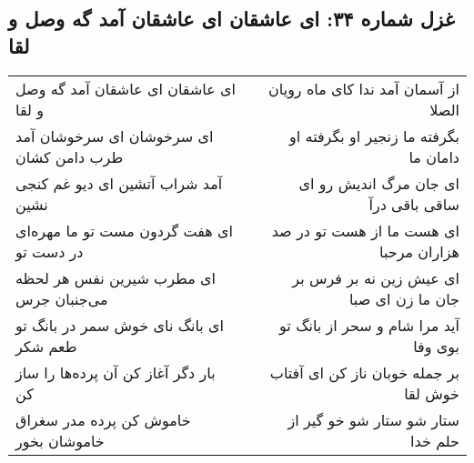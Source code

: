 \begin{center}
\section*{غزل شماره ۳۴: ای عاشقان ای عاشقان آمد گه وصل و لقا}
\label{sec:0034}
\begin{longtable}{l p{0.5cm} r}
ای عاشقان ای عاشقان آمد گه وصل و لقا
&&
از آسمان آمد ندا کای ماه رویان الصلا
\\
ای سرخوشان ای سرخوشان آمد طرب دامن کشان
&&
بگرفته ما زنجیر او بگرفته او دامان ما
\\
آمد شراب آتشین ای دیو غم کنجی نشین
&&
ای جان مرگ اندیش رو ای ساقی باقی درآ
\\
ای هفت گردون مست تو ما مهره‌ای در دست تو
&&
ای هست ما از هست تو در صد هزاران مرحبا
\\
ای مطرب شیرین نفس هر لحظه می‌جنبان جرس
&&
ای عیش زین نه بر فرس بر جان ما زن ای صبا
\\
ای بانگ نای خوش سمر در بانگ تو طعم شکر
&&
آید مرا شام و سحر از بانگ تو بوی وفا
\\
بار دگر آغاز کن آن پرده‌ها را ساز کن
&&
بر جمله خوبان ناز کن ای آفتاب خوش لقا
\\
خاموش کن پرده مدر سغراق خاموشان بخور
&&
ستار شو ستار شو خو گیر از حلم خدا
\\
\end{longtable}
\end{center}

